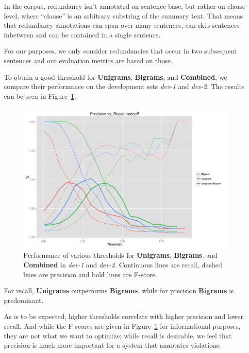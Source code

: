 \documentclass[a4paper,10pt]{scrartcl}
\theoremstyle{style}
\begin{document}
In the corpus, redundancy isn't annotated on sentence base, but rather on clause level, where ``clause'' is an arbitrary substring of the summary text. That means that redundancy annotations can span over many sentences, can skip sentences inbetween and can be contained in a single sentence.

For our purposes, we only consider redundancies that occur in two subsequent sentences and our evaluation metrics are based on those.

To obtain a good threshold for \textbf{Unigrams}, \textbf{Bigrams}, and \textbf{Combined}, we compare their performance on the development sets \textit{dev-1} and \textit{dev-2}. The results can be seen in Figure~\ref{redundancy_graph}.

\begin{figure}
\begin{center}
\includegraphics[scale=0.15]{a.png}
\end{center}
\caption{Performance of various thresholds for \textbf{Unigrams}, \textbf{Bigrams}, and \textbf{Combined} in \textit{dev-1} and \textit{dev-2}. Continuous lines are recall, dashed lines are precision and bold lines are F-score.}
\label{redundancy_graph}
\end{figure}

For recall, \textbf{Unigrams} outperforms \textbf{Bigrams}, while for precision \textbf{Bigrams} is predominant.

As is to be expected, higher thresholds correlate with higher precision and lower recall. And while the F-scores are given in Figure~\ref{redundancy_graph} for informational purposes, they are not what we want to optimize; while recall is desirable, we feel that precision is much more important for a system that annotates violations.
\end{document}
